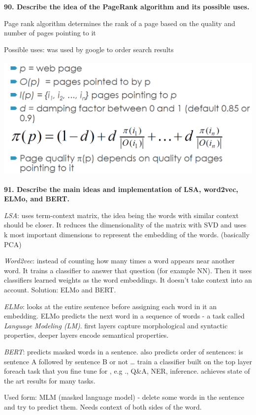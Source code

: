 \textbf{90. Describe the idea of the PageRank algorithm and its possible
uses.}

Page rank algorithm determines the rank of a page based on the quality
and number of pages pointing to it

Possible uses: was used by google to order search results

\includegraphics[width=5.42188in,height=2.41372in]{media/image2.png}

\textbf{91. Describe the main ideas and implementation of LSA, word2vec,
ELMo, and BERT.}

\textit{LSA}: uses term-context matrix, the idea being the words with
similar context should be closer. It reduces the dimensionality of the
matrix with SVD and uses k most important dimensions to represent the
embedding of the words. (basically PCA)

\textit{Word2vec}: instead of counting how many times a word appears
near another word. It trains a classifier to answer that question (for
example NN). Then it uses classifiers learned weights as the word
embeddings. It doesn't take context into an account. Solution: ELMo and
BERT.

\textit{ELMo}: looks at the entire sentence before assigning each
word in it an embedding. ELMo predicts the next word in a sequence of
words - a task called \emph{Language Modeling (LM)}. first layers
capture morphological and syntactic properties, deeper layers encode
semantical properties.

\textit{BERT}: predicts masked words in a sentence. also predicts
order of sentences: is sentence A followed by sentence B or not \ldots{}
train a classifier built on the top layer foreach task that you fine
tune for , e.g ., Q\&A, NER, inference. achieves state of the art
results for many tasks.

Used form: MLM (masked language model) - delete some words in the
sentence and try to predict them. Needs context of both sides of the
word.

